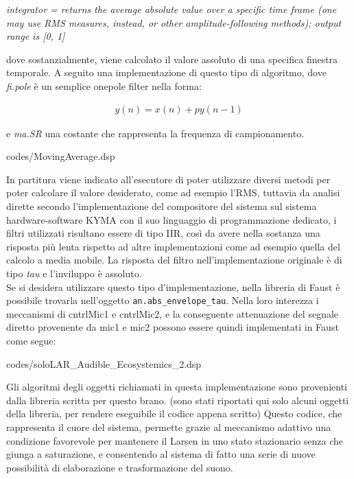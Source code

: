 \begin{center}
    \vspace{0.5cm}
    \textit{integrator = returns the average absolute value over a specific 
    time frame (one may use RMS measures, instead, or other amplitude-following methods); 
    output range is [0, 1]}
    \vspace{0.5cm}
\end{center}

dove sostanzialmente, viene calcolato il valore assoluto di una specifica finestra temporale. 
A seguito una implementazione di questo tipo di algoritmo, dove \textit{fi.pole} è 
un semplice onepole filter nella forma: 

\begin{align*} 
    y(n) = x(n) + py(n-1)
\end{align*}

e \textit{ma.SR} una costante che rappresenta la frequenza di campionamento.

\vspace{0.5cm} 

{codes/MovingAverage.dsp}

In partitura viene indicato all'esecutore di poter utilizzare diversi metodi 
per poter calcolare il valore desiderato, come ad esempio l'RMS, 
tuttavia da analisi dirette secondo l'implementazione del compositore del sistema sul 
sistema hardware-software KYMA con il suo linguaggio di programmazione dedicato, 
i filtri utilizzati risultano essere di tipo IIR,
così da avere nella sostanza una risposta più lenta rispetto ad altre implementazioni come ad esempio 
quella del calcolo a media mobile.  
La risposta del filtro nell'implementazione originale è di tipo \textit{tau} 
e l'inviluppo è assoluto. \\
Se si desidera utilizzare questo tipo d'implementazione, nella libreria di Faust 
è possibile trovarla nell'oggetto \verb|an.abs_envelope_tau|.
Nella loro interezza i meccanismi di cntrlMic1 e cntrlMic2, e la conseguente
attenuazione del segnale diretto provenente da mic1 e mic2 
possono essere quindi implementati in Faust come segue:

\vspace{0.5cm} 

{codes/soloLAR_Audible_Ecosystemics_2.dsp}

Gli algoritmi degli oggetti richiamati in questa implementazione sono 
provenienti dalla libreria scritta per questo brano.
(sono stati riportati qui solo alcuni oggetti della libreria, per rendere eseguibile
il codice appena scritto)
Questo codice, che rappresenta il cuore del sistema,
permette grazie al meccanismo adattivo una condizione favorevole
per mantenere il Larsen in uno stato stazionario senza che giunga a 
saturazione, e consentendo al sistema
di fatto una serie di nuove possibilità di elaborazione e trasformazione del suono.

